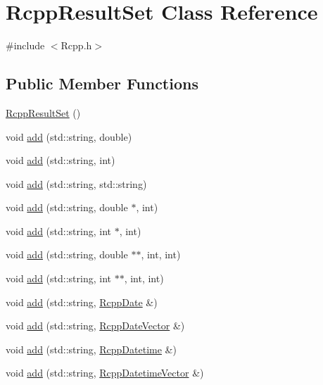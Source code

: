 \hypertarget{classRcppResultSet}{
\section{RcppResultSet Class Reference}
\label{classRcppResultSet}
}


{\ttfamily \#include $<$Rcpp.h$>$}\subsection*{Public Member Functions}
\begin{DoxyCompactItemize}
\item 
\hyperlink{classRcppResultSet_ab799c6b9bd730e55d92228203903ba74}{RcppResultSet} ()
\item 
void \hyperlink{classRcppResultSet_a7c7da37f18bd352303bf06b7c5233bc4}{add} (std::string, double)
\item 
void \hyperlink{classRcppResultSet_a8b7841ff8a52477b0c6a1fb7c03c0fd9}{add} (std::string, int)
\item 
void \hyperlink{classRcppResultSet_a2633372ab2f50b269e9e26dd7a489492}{add} (std::string, std::string)
\item 
void \hyperlink{classRcppResultSet_a5d06d8a4f0497abc6fad4ea22b4934f9}{add} (std::string, double $\ast$, int)
\item 
void \hyperlink{classRcppResultSet_a494dbe1f6db48bf48e9e33a32d897f29}{add} (std::string, int $\ast$, int)
\item 
void \hyperlink{classRcppResultSet_a88ff0e3db486eec0012eb58beee05e9b}{add} (std::string, double $\ast$$\ast$, int, int)
\item 
void \hyperlink{classRcppResultSet_a2cca9ea4e9554c4fad9bc326355c354c}{add} (std::string, int $\ast$$\ast$, int, int)
\item 
void \hyperlink{classRcppResultSet_ae5cb861a0d6e95cc7ed465ccae2ac4a7}{add} (std::string, \hyperlink{classRcppDate}{RcppDate} \&)
\item 
void \hyperlink{classRcppResultSet_ad7efd746596959ce68ca98c690a2f645}{add} (std::string, \hyperlink{classRcppDateVector}{RcppDateVector} \&)
\item 
void \hyperlink{classRcppResultSet_a1d921e7a24e50369ae67a1bc63826131}{add} (std::string, \hyperlink{classRcppDatetime}{RcppDatetime} \&)
\item 
void \hyperlink{classRcppResultSet_aac8cade970247a377e8dbebf1c79a86c}{add} (std::string, \hyperlink{classRcppDatetimeVector}{RcppDatetimeVector} \&)
\item 

\end{DoxyCompactItemize}
